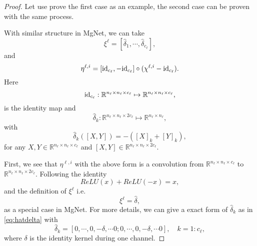 \begin{proof}
Let use prove the first case as an example, 
the second case can be proven with the same process.

With similar structure in MgNet, we can take
\begin{equation}
\label{xi-cnn1}
\xi^{\ell}=  [\hat \delta_1, \cdots, \hat \delta_{{c_\ell}}],
\end{equation}
and 
\begin{equation}
\label{eta-ell}
\eta^{\ell,i} = [{\rm id}_{c_\ell}, -{\rm id}_{c_\ell}] \circ (\chi^{\ell,i} - {\rm id}_{c_\ell}).
\end{equation}
Here 
\begin{equation}
{\rm id}_{c_\ell}: \mathbb{R}^{n_\ell \times n_\ell \times c_\ell} 
\mapsto \mathbb{R}^{n_\ell \times n_\ell \times c_\ell},
\end{equation}
is the identity map and 
\begin{equation}
\hat \delta_k :  \mathbb{R}^{n_\ell \times n_\ell \times 2c_\ell} 
\mapsto \mathbb{R}^{n_\ell \times n_\ell},
\end{equation}
with 
\begin{equation}\label{eq:hatdelta}
\hat \delta_k([X ,Y]) = -([X]_k + [Y]_k),
\end{equation}
for any $X, Y \in \mathbb{R}^{n_\ell \times n_\ell \times c_\ell}$ 
and $[X,Y] \in \mathbb{R}^{n_\ell \times n_\ell \times 2c_\ell} $.


	First, we see that $\eta^{\ell,i}$ with the above 
	form is a convolution from $\mathbb{R}^{n_\ell \times n_\ell \times c_\ell}$
	to  $\mathbb{R}^{n_\ell \times n_\ell \times 2c_\ell}$.
	Following the identity
	\begin{equation}
	ReLU(x) + ReLU(-x) = x,
	\end{equation}
	and the definition of $\xi^{\ell}$ i.e. 
	\begin{equation}
	\xi^{\ell} = \hat \delta,
	\end{equation}
	as a special case in MgNet. 
	For more details, we can give a exact form of 
	$\hat \delta_k$ as in \eqref{eq:hatdelta} with
	\begin{equation}
	\hat \delta_k = [0, \cdots,0, -\delta, \cdots 0;  0, \cdots,0, -\delta, \cdots 0],  \quad k = 1:{c_\ell},
	\end{equation}
	where $\delta$ is the identity kernel during one channel.
	

\end{proof}
